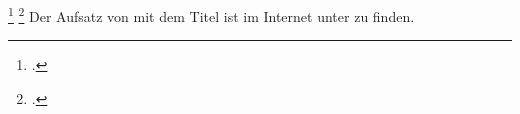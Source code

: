 \documentclass{scrartcl}
\begin{document}
\cite[Vgl.][9-26]{Tibi2011}
\cites[Vgl.][9-26]{Tibi2011}[][121]{Gettier1963}{Berkmann2020}
\parencite[][121]{Gettier1963}
\parencites[Vgl.][9-26]{Tibi2011}[][121]{Gettier1963}{Berkmann2020}
\footcite{Berkmann2020}
\footcites[Vgl.][9-26]{Tibi2011}[][121]{Gettier1963}{Berkmann2020}
Der Aufsatz von \citeauthor{Berkmann2020} mit dem Titel  ist im Internet unter  zu finden.
\printbibliography[type=book,title={Bücher}]
\printbibliography[type=article,title={Artikel}]
\printbibliography[type=misc,title={Sonstiges}]
\end{document}
